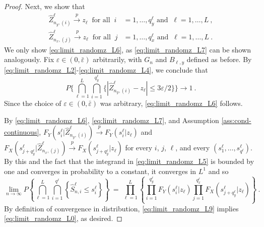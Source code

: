 \documentclass[11pt]{article}
\numberwithin{equation}{section}
\begin{document}
\begin{proof}
  Next, we show that
  \begin{align}
  \hat Z_{n_{y},\left(i\right)}^{\ell}\overset{p}{\rightarrow}z_{\ell}~\text{ for all }~
  i&=1,\dots,q_{y}^{\ell}\text{ and }~\ell=1,\ldots,L~,\label{eq:limit_randomz_L6}\\
  \hat Z_{n_{x},\left(j\right)}^{\ell}\overset{p}{\rightarrow}z_{\ell}~\text{ for all }~
  j&=1,\dots,q_{x}^{\ell}\text{ and }~\ell=1,\ldots,L~.\label{eq:limit_randomz_L7}
  \end{align}
  We only show \eqref{eq:limit_randomz_L6}, as \eqref{eq:limit_randomz_L7} can be shown analogously. Fix $\varepsilon\in(0,\bar\varepsilon)$ arbitrarily, with $G_n$ and $B_{\ell,y}$ defined as before. By \eqref{eq:limit_randomz_L2}-\eqref{eq:limit_randomz_L4}, we conclude that
  \begin{equation*}
  P\Big\{\bigcap_{\ell=1}^{L}\bigcap_{i=1}^{q_y^\ell}
  \{|\hat Z_{n_{y},\left(i\right)}^{\ell}-z_{\ell}|\leq 3\varepsilon/2\}\Big\}\rightarrow 1~.
  \end{equation*}
  Since the choice of $\varepsilon\in(0,\bar\varepsilon)$ was arbitrary, \eqref{eq:limit_randomz_L6} follows.

  By \eqref{eq:limit_randomz_L6}, \eqref{eq:limit_randomz_L7}, and Assumption \ref{ass:cond-continuous}, $F_{Y}(s_{i}^{\ell}|\hat Z_{n_{y},(i)}^{\ell})\overset{p}{\rightarrow} F_{Y}(s_{i}^{\ell}|z_{\ell})$ and $F_{X}(s_{j+q_{y}^{\ell}}^{\ell}|\hat Z_{n_{x},(j)}^{\ell})\overset{p}{\rightarrow} F_{X}(s_{j+q_{y}^{\ell}}^{\ell}|z_{\ell})$ for every $i$, $j$, $\ell$, and every $(s_{1}^{\ell},\dots,s_{q^{\ell}}^{\ell})$. By this and the fact that the integrand in \eqref{eq:limit_randomz_L5} is bounded by one and converges in probability to a constant, it converges in $L^1$ and so 
  \begin{equation}
  \lim_{n\rightarrow\infty}P\left\{\bigcap_{\ell=1}^{L}\bigcap_{i=1}^{q^{\ell}}\left\{
  \hat S_{n,i}^{\ell}\leq s_{i}^{\ell}\right\}\right\}~
  =~\prod_{\ell=1}^{L}\left\{
  \prod_{i=1}^{q_{y}^{\ell}}F_{Y}(s_{i}^{\ell}|z_{\ell})\prod_{j=1}^{q_{x}^{\ell}}
  F_{X}(s_{j+q_{y}^{\ell}}^{\ell}|z_{\ell})\right\}~.
  \label{eq:limit_randomz_L9}
  \end{equation}
  By definition of convergence in distribution, \eqref{eq:limit_randomz_L9} implies \eqref{eq:limit_randomz_L0}, as desired.
\end{proof}
\end{document}
